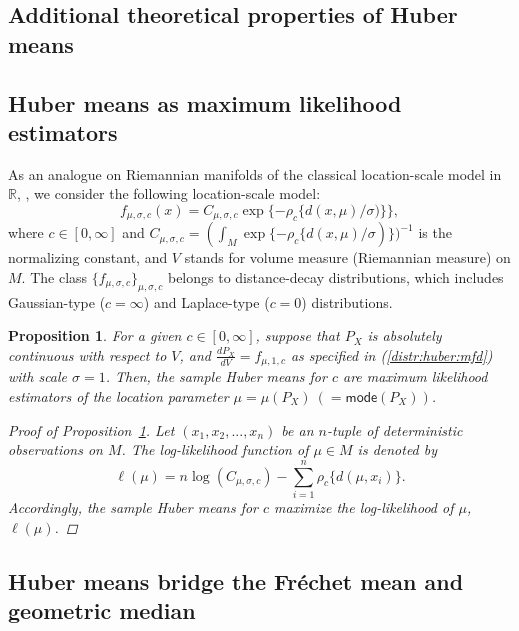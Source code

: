 \documentclass[preprint]{imsart}
\newcommand{\bbR}{\mathbb{R}}
\theoremstyle{plain}
\newtheorem{proposition}{Proposition}
\theoremstyle{remark}
\begin{document}
\begin{appendix}

\section{Additional theoretical properties of Huber means}

\subsection{Huber means as maximum likelihood estimators} 


As an analogue on Riemannian manifolds of the classical location-scale model in $\bbR$, \citep[e.g.,][]{lax1985robust, rousseeuw2002robust}, we 
consider the following location-scale model:
\begin{equation}\label{distr:huber:mfd}
f_{\mu, \sigma, c}(x) = C_{\mu, \sigma, c} \exp\{-\rho_{c}\{d(x, \mu)/\sigma)\}\},
\end{equation}
where $c \in [0, \infty]$ and $C_{\mu, \sigma, c}=(\int_{M} \exp\{-\rho_{c}\{d(x, \mu)/\sigma)\})^{-1}$ is the normalizing constant, and $V$ stands for volume measure (Riemannian measure) on $M$. The class $\{f_{\mu, \sigma, c}\}_{\mu, \sigma, c}$ belongs to distance-decay distributions, which includes Gaussian-type ($c=\infty$) and Laplace-type ($c=0$) distributions.
\begin{proposition}\label{prop:MLE}
For a given $c \in [0, \infty]$, suppose that $P_{X}$ is absolutely continuous with respect to $V$, and $\frac{d P_{X}}{dV} = f_{\mu, 1, c}$ as specified in (\ref{distr:huber:mfd}) with scale $\sigma=1$. Then, the sample Huber means for $c$ are maximum likelihood estimators of the location parameter $\mu= \mu(P_{X}) ~(= \textsf{mode}(P_{X}))$.
\begin{proof}[Proof of Proposition~\ref{prop:MLE}]
Let $(x_{1}, x_{2}, ..., x_{n})$ be an $n$-tuple of deterministic observations on $M$. The log-likelihood function of $\mu \in M$ is denoted by
\[
\ell(\mu) = n \log(C_{\mu, \sigma, c}) - \sum_{i=1}^{n} \rho_{c}\{d(\mu, x_i)\}. 
\]
Accordingly, the sample Huber means for $c$ maximize the log-likelihood of $\mu$, $\ell(\mu)$.
\end{proof}
\end{proposition}


\subsection{Huber means bridge the Fr\'{e}chet mean and geometric median}\label{sec:bridge}


\end{appendix}
\end{document}
